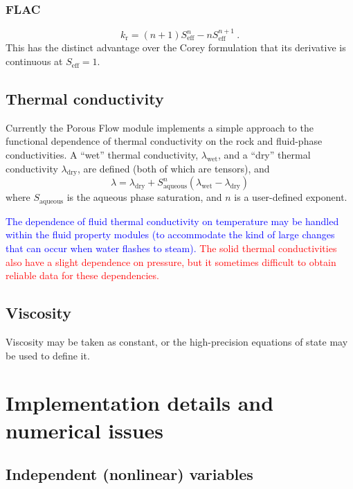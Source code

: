 \documentclass[12pt]{report}
\begin{document}
\subsection{FLAC}

\begin{equation}
k_{\mathrm{r}} = (n + 1)S_{\mathrm{eff}}^{n} - n S_{\mathrm{eff}}^{n +
  1} \ .
\end{equation}
This has the distinct advantage over the Corey formulation that its
derivative is continuous at $S_{\mathrm{eff}}=1$.



\section{Thermal conductivity}

Currently the Porous Flow module implements a
simple approach to the functional dependence of thermal conductivity
on the rock and fluid-phase conductivities.  A ``wet'' thermal
conductivity, $\lambda_{\mathrm{wet}}$, and a ``dry'' thermal
conductivity $\lambda_{\mathrm{dry}}$, are defined (both of which are
tensors), and
\begin{equation}
  \lambda = \lambda_{\mathrm{dry}} + S_{\mathrm{aqueous}}^{n}
  (\lambda_{\mathrm{wet}}-\lambda_{\mathrm{dry}})
\end{equation}
where $S_{\mathrm{aqueous}}$ is the aqueous phase saturation, and $n$
is a user-defined exponent.

\textcolor{blue}{The dependence of fluid thermal conductivity on temperature may be
handled within the fluid property modules (to accommodate
the kind of large changes that can occur when water flashes to
steam).}  \textcolor{red}{The solid thermal
conductivities also have a slight dependence on pressure, but it
sometimes difficult to obtain reliable data for these dependencies.}

\section{Viscosity}

Viscosity may be taken as constant, or the high-precision equations of
state may be used to define it.

\chapter{Implementation details and numerical issues}

\section{Independent (nonlinear) variables}
\end{document}
